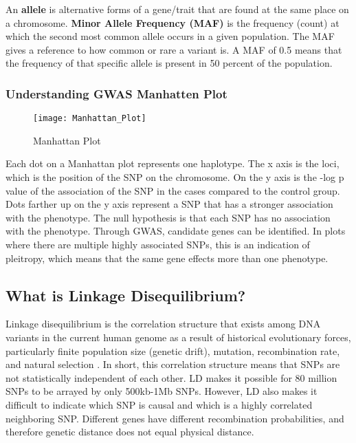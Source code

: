 An \textbf{allele} is alternative forms of a gene/trait that are found at the same place on a chromosome. \textbf{Minor Allele Frequency (MAF)} is the frequency (count) at which the second most common allele occurs in a given population. The MAF gives a reference to how common or rare a variant is. A MAF of 0.5 means that the frequency of that specific allele is present in 50 percent of the population.

\subsubsection{Understanding GWAS Manhatten Plot}


\begin{figure}[h]
\centering
\texttt{[image: Manhattan\_Plot]}
\caption{Manhattan Plot}
\label{fig: Manhattan Plot }
\end{figure}


Each dot on a Manhattan plot represents one haplotype. The x axis is the loci, which is the position of the SNP on the chromosome. On the y axis is the -log p value of the association of the SNP in the cases compared to the control group. Dots farther up on the y axis represent a SNP that has a stronger association with the phenotype. The null hypothesis is that each SNP has no association with the phenotype. Through GWAS, candidate genes can be identified. In plots where there are multiple highly associated SNPs, this is an indication of pleitropy, which means that the same gene effects more than one phenotype. 


\subsection{ What is Linkage Disequilibrium?}

Linkage disequilibrium is the correlation structure that exists among DNA variants in the current human genome as a result of historical evolutionary forces, particularly finite population size (genetic drift), mutation, recombination rate, and natural selection \cite{Visscher2017}. In short, this correlation structure means that SNPs are not statistically independent of each other. LD makes it possible for 80 million SNPs to be arrayed by only 500kb-1Mb SNPs. However, LD also makes it difficult to indicate which SNP is causal and which is a highly correlated neighboring SNP. 
Different genes have different recombination probabilities, and therefore genetic distance does not equal physical distance. 

